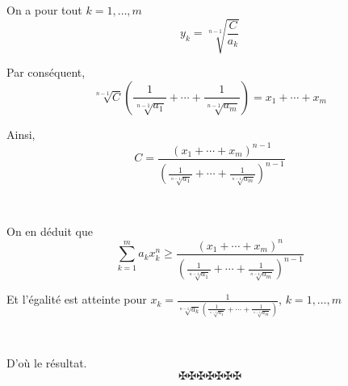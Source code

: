 On a pour tout $k = 1, \ldots, m$
\[ y_k = \sqrt[n - 1]{\frac{C}{a_k}} \]


Par cons{\'e}quent,
\[ \sqrt[n - 1]{C} \left( \frac{1}{\sqrt[n - 1]{a_1}} + \cdots +
   \frac{1}{\sqrt[n - 1]{a_m}} \right) = x_1 + \cdots + x_m \]


Ainsi,
\[ C = \frac{(x_1 + \cdots + x_m)^{n - 1}}{\left( \frac{1}{\sqrt[n - 1]{a_1}}
   + \cdots + \frac{1}{\sqrt[n - 1]{a_m}} \right)^{n - 1}} \]


\

On en d{\'e}duit que
\[ \underset{k = 1}{\overset{m}{\sum}} a_k x^{n }_k \underset{}{\overset{}{}}
   \geqslant \frac{(x_1 + \cdots + x_m)^n}{\left( \frac{1}{\sqrt[n - 1]{a_1}}
   + \cdots + \frac{1}{\sqrt[n - 1]{a_m}} \right)^{n - 1}} \]


Et l'{\'e}galit{\'e} est atteinte pour $x_k = \frac{1}{\sqrt[n - 1]{a_k}
\left( \frac{1}{\sqrt[n - 1]{a_1}} + \cdots + \frac{1}{\sqrt[n - 1]{a_m}}
\right)}$, $k = 1, \ldots, m$

\

D'o{\`u} le r{\'e}sultat.
\[ \maltese \maltese \maltese \maltese \maltese \maltese \maltese \]
